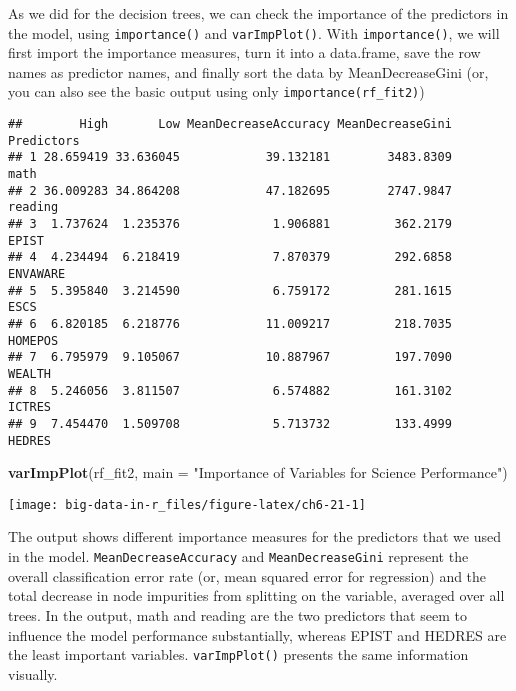 \documentclass[]{book}
\newenvironment{Shaded}{\begin{snugshade}}{\end{snugshade}}
\newcommand{\DataTypeTok}[1]{\textcolor[rgb]{0.13,0.29,0.53}{#1}}
\newcommand{\KeywordTok}[1]{\textcolor[rgb]{0.13,0.29,0.53}{\textbf{#1}}}
\newcommand{\NormalTok}[1]{#1}
\newcommand{\OperatorTok}[1]{\textcolor[rgb]{0.81,0.36,0.00}{\textbf{#1}}}
\newcommand{\StringTok}[1]{\textcolor[rgb]{0.31,0.60,0.02}{#1}}
\begin{document}
As we did for the decision trees, we can check the importance of the predictors in the model, using \texttt{importance()} and \texttt{varImpPlot()}. With \texttt{importance()}, we will first import the importance measures, turn it into a data.frame, save the row names as predictor names, and finally sort the data by MeanDecreaseGini (or, you can also see the basic output using only \texttt{importance(rf\_fit2)})

\begin{Shaded}
\end{Shaded}

\begin{verbatim}
##        High       Low MeanDecreaseAccuracy MeanDecreaseGini Predictors
## 1 28.659419 33.636045            39.132181        3483.8309       math
## 2 36.009283 34.864208            47.182695        2747.9847    reading
## 3  1.737624  1.235376             1.906881         362.2179      EPIST
## 4  4.234494  6.218419             7.870379         292.6858   ENVAWARE
## 5  5.395840  3.214590             6.759172         281.1615       ESCS
## 6  6.820185  6.218776            11.009217         218.7035    HOMEPOS
## 7  6.795979  9.105067            10.887967         197.7090     WEALTH
## 8  5.246056  3.811507             6.574882         161.3102     ICTRES
## 9  7.454470  1.509708             5.713732         133.4999     HEDRES
\end{verbatim}

\begin{Shaded}
\begin{Highlighting}[]
\KeywordTok{varImpPlot}\NormalTok{(rf_fit2, }
           \DataTypeTok{main =} \StringTok{"Importance of Variables for Science Performance"}\NormalTok{)}
\end{Highlighting}
\end{Shaded}

\texttt{[image: big-data-in-r\_files/figure-latex/ch6-21-1]}

The output shows different importance measures for the predictors that we used in the model. \texttt{MeanDecreaseAccuracy} and \texttt{MeanDecreaseGini} represent the overall classification error rate (or, mean squared error for regression) and the total decrease in node impurities from splitting on the variable, averaged over all trees. In the output, math and reading are the two predictors that seem to influence the model performance substantially, whereas EPIST and HEDRES are the least important variables. \texttt{varImpPlot()} presents the same information visually.
\end{document}
